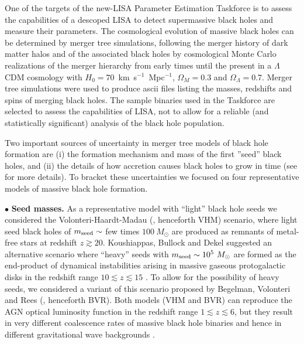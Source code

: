 \documentclass{iopart}
\begin{document}
One of the targets of the new-LISA Parameter Estimation Taskforce 
is to assess the capabilities of a descoped LISA to detect supermassive 
black holes and measure their
parameters. The cosmological evolution of massive black holes can be
determined by merger tree simulations, following the merger history of dark
matter halos and of the associated black holes by cosmological Monte Carlo
realizations of the merger hierarchy from early times until the present in a
$\Lambda$CDM cosmology with $H_0=70$~km~s$^{-1}$~Mpc$^{-1}$, $\Omega_M=0.3$
and $\Omega_{\Lambda}=0.7$. Merger tree simulations were used to produce
ascii files listing the masses, redshifts and spins of merging black
holes. The sample binaries used in the Taskforce are selected to assess the
capabilities of LISA, not to allow for a reliable (and statistically
significant) analysis of the black hole population.

Two important sources of uncertainty in merger tree models of black hole
formation are (i) the formation mechanism and mass of the first ''seed'' black
holes, and (ii) the details of how accretion causes black holes to grow in
time (see \cite{Sesana:2007sh} for more details). To bracket these
uncertainties we focused on four representative models of massive black hole
formation.

$\bullet$  {\bf Seed masses.} As a representative model with ``light'' black hole seeds we considered the
Volonteri-Haardt-Madau (\cite{Volonteri:2002vz}, henceforth VHM) scenario,
where light seed black holes of $m_{\rm seed}\sim$ few times $100~M_\odot$ are
produced as remnants of metal-free stars at redshift $z\gtrsim 20$.
Koushiappas, Bullock and Dekel suggested an alternative scenario where
``heavy'' seeds with $m_{\rm seed}\sim 10^5~M_\odot$ are formed as the
end-product of dynamical instabilities arising in massive gaseous
protogalactic disks in the redshift range $10\lesssim z \lesssim 15$
\cite{Koushiappas:2003zn}. To allow for the possibility of heavy seeds, we
considered a variant of this scenario proposed by Begelman, Volonteri and Rees
(\cite{Begelman:2006db}, henceforth BVR).  Both models (VHM and BVR) can
reproduce the AGN optical luminosity function in the redshift range $1\lesssim
z\lesssim 6$, but they result in very different coalescence rates of massive
black hole binaries and
hence in different gravitational wave backgrounds \cite{Sesana:2007sh}.
\end{document}
